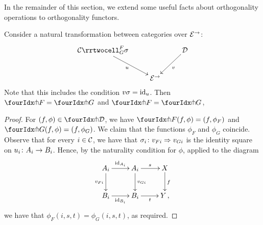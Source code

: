 \documentclass[reqno,10pt,a4paper,oneside]{amsart}
\begin{document}
In the remainder of this section, we extend some useful facts about orthogonality operations to orthogonality functors.






\begin{proposition}
Consider a natural transformation between categories over $\catE^{\to}$:
\[
\xymatrix{
  \cal{C}
  \rrtwocell_G^F{\sigma}
 \ar[dr]_{u}
&&
  \cal{D}
  \ar[dl]^{v}
\\&
  \catE^{\to}
}
\]
Note that this includes the condition $v \sigma = \id_u$.
Then $\liftr{F} = \liftr{G}$ and $\liftl{F} = \liftl{G}$, 
\end{proposition}

\begin{proof} For $(f, \phi) \in \liftr{\cal{D}}$, we have $\liftr{F}(f, \phi) = (f, \phi_F)$ and $\liftr{G}(f, \phi) = (f, \phi_G)$.
We claim that the functions $\phi_F$ and $\phi_G$ coincide. Observe that 
for every $i \in \cal{C}$, we have that $\sigma_i \co v_{Fi}  \Rightarrow v_{Gi}$ is the identity square on $u_i
\co A_i \to B_i$. Hence, by the naturality condition for $\phi$, applied to the diagram 
\[
\xymatrix{
A_i \ar[r]^{\id_{A_i}} \ar[d]_{v_{Fi}}  & A_i \ar[d]^{v_{Gi}} \ar[r]^{s}  & X \ar[d]^{f} \\
B_i \ar[r]_{\id_{B_i}} & B_i \ar[r]_{t} & Y \, ,}
\]
we have  that $\phi_F(i, s, t) = \phi_G(i, s, t)$, as required.
\end{proof} 
\end{document}
